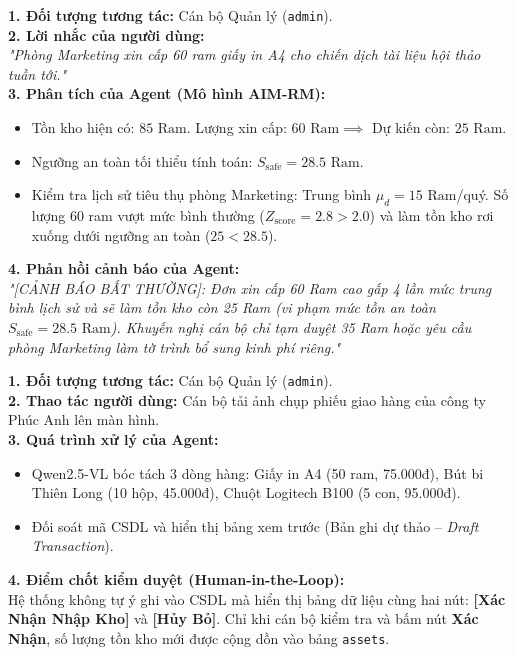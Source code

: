 \documentclass[11pt,a4paper]{article}
\begin{document}
\begin{scenariobox}
\textbf{1. Đối tượng tương tác:} Cán bộ Quản lý (\texttt{admin}).\\
\textbf{2. Lời nhắc của người dùng:}\\
\textit{"Phòng Marketing xin cấp 60 ram giấy in A4 cho chiến dịch tài liệu hội thảo tuần tới."}\\
\textbf{3. Phân tích của Agent (Mô hình AIM-RM):}
\begin{itemize}[leftmargin=1.2em, itemsep=2pt]
    \item Tồn kho hiện có: $85\text{ Ram}$. Lượng xin cấp: $60\text{ Ram} \implies$ Dự kiến còn: $25\text{ Ram}$.
    \item Ngưỡng an toàn tối thiểu tính toán: $S_{\text{safe}} = 28.5\text{ Ram}$.
    \item Kiểm tra lịch sử tiêu thụ phòng Marketing: Trung bình $\mu_d = 15\text{ Ram}$/quý. Số lượng 60 ram vượt mức bình thường ($Z_{\text{score}} = 2.8 > 2.0$) và làm tồn kho rơi xuống dưới ngưỡng an toàn ($25 < 28.5$).
\end{itemize}
\textbf{4. Phản hồi cảnh báo của Agent:}\\
\textit{"[CẢNH BÁO BẤT THƯỜNG]: Đơn xin cấp 60 Ram cao gấp 4 lần mức trung bình lịch sử và sẽ làm tồn kho còn 25 Ram (vi phạm mức tồn an toàn $S_{\text{safe}} = 28.5\text{ Ram}$). Khuyến nghị cán bộ chỉ tạm duyệt 35 Ram hoặc yêu cầu phòng Marketing làm tờ trình bổ sung kinh phí riêng."}
\end{scenariobox}

\begin{scenariobox}
\textbf{1. Đối tượng tương tác:} Cán bộ Quản lý (\texttt{admin}).\\
\textbf{2. Thao tác người dùng:} Cán bộ tải ảnh chụp phiếu giao hàng của công ty Phúc Anh lên màn hình.\\
\textbf{3. Quá trình xử lý của Agent:}
\begin{itemize}[leftmargin=1.2em, itemsep=2pt]
    \item Qwen2.5-VL bóc tách 3 dòng hàng: Giấy in A4 (50 ram, 75.000đ), Bút bi Thiên Long (10 hộp, 45.000đ), Chuột Logitech B100 (5 con, 95.000đ).
    \item Đối soát mã CSDL và hiển thị bảng xem trước (Bản ghi dự thảo -- \textit{Draft Transaction}).
\end{itemize}
\textbf{4. Điểm chốt kiểm duyệt (Human-in-the-Loop):}\\
Hệ thống không tự ý ghi vào CSDL mà hiển thị bảng dữ liệu cùng hai nút: \textbf{[Xác Nhận Nhập Kho]} và \textbf{[Hủy Bỏ]}. Chỉ khi cán bộ kiểm tra và bấm nút \textbf{Xác Nhận}, số lượng tồn kho mới được cộng dồn vào bảng \texttt{assets}.
\end{scenariobox}
\end{document}

